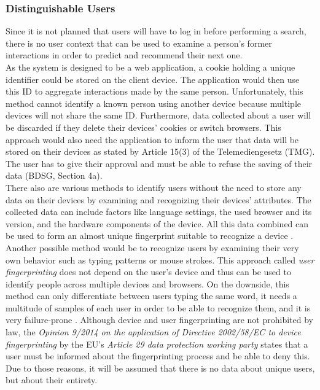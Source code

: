 \subsubsection{Distinguishable Users}
Since it is not planned that users will have to log in before performing a search,
there is no user context that can be used to examine a person's former interactions
in order to predict and recommend their next one.\\
As the system is designed to be a web application, a cookie holding a unique identifier could be stored on the client device. The application would then use this ID to aggregate interactions made by the same person. Unfortunately, this method cannot identify a known person using another device because multiple devices will not share the same ID. Furthermore, data collected about a user will be discarded if they delete their devices' cookies or switch browsers.
This approach would also need the application to inform the user that data will be stored on their devices as stated by Article 15(3) of the Telemediengesetz (TMG). The user has to give their approval and must be able to refuse the saving of their data (BDSG, Section 4a).\\
There also are various methods to identify users without the need to store any data on their devices by examining and recognizing their devices' attributes. The collected data can include
factors like language settings, the used browser and its version, and the hardware components of the device. All this data combined can be used to form an almost unique fingerprint suitable to recognize a device \cite{finger}.\\
Another possible method would be to recognize users by examining their very own behavior such as typing patterns or mouse strokes. This approach called \textit{user fingerprinting} does not depend on the user's device and thus can be used to identify people across multiple devices and browsers. On the downside, this method can only differentiate between users typing the same word, it needs a multitude of samples of each user in order to be able to recognize them, and it is very failure-prone \cite{typing}.
Although device and user fingerprinting are not prohibited by law,
the \textit{Opinion 9/2014 on the application of Directive 2002/58/EC to device
fingerprinting} by the EU's \textit{Article 29 data protection working party} states that a user must be informed about the fingerprinting process and be able to deny this.
Due to those reasons, it will be assumed that there is no data about unique users, but about their entirety.
